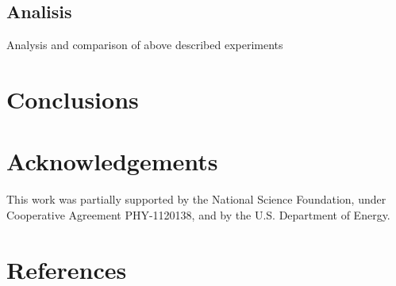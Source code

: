 \documentclass[a4paper]{jpconf}
\begin{document}
\subsection{Analisis}
    Analysis and comparison of above described experiments


\section{Conclusions}

\section*{Acknowledgements}
This work was partially supported by the National Science Foundation, under
Cooperative Agreement PHY-1120138, and by the U.S. Department of Energy.

\section*{References}



\end{document}
